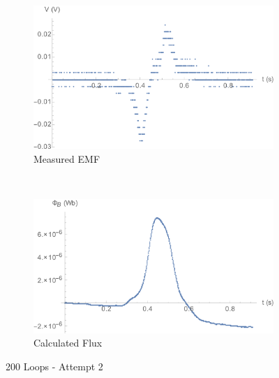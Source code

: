 \documentclass[a4paper]{scrartcl}
\begin{document}
\begin{figure}[p]
    \centering
    \begin{subfigure}[b]{0.45\textwidth}
        \includegraphics[width = \textwidth]{200_2_voltage.png}
        \caption{Measured EMF}
    \end{subfigure}
    ~
    \begin{subfigure}[b]{0.45\textwidth}
        \includegraphics[width = \textwidth]{200_2_flux.png}
        \caption{Calculated Flux}
    \end{subfigure}
    \caption{200 Loops - Attempt 2}
    \label{fig:200_2}
\end{figure}
\end{document}
